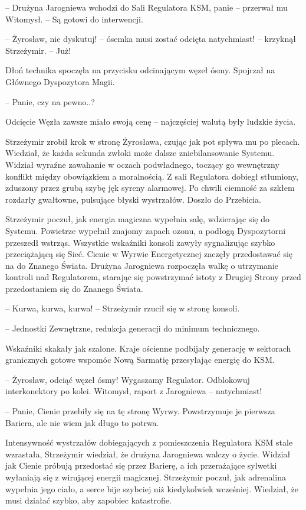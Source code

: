 \par\noindent-- Drużyna Jarogniewa wchodzi do Sali Regulatora KSM, panie -- przerwał mu Witomysł. -- Są gotowi do interwencji.
\par\noindent-- Żyrosław, nie dyskutuj! -- ósemka musi zostać odcięta natychmiast! -- krzyknął Strzeżymir. -- Już!
\par\indent Dłoń technika spoczęła na przycisku odcinającym węzeł ósmy. Spojrzał na Głównego Dyspozytora Magii.
\par\noindent-- Panie, czy na pewno..? 
\par\noindent Odcięcie Węzła zawsze miało swoją cenę -- najczęściej walutą były ludzkie życia.
\par\indent Strzeżymir zrobił krok w stronę Żyrosława, czując jak pot spływa mu po plecach. Wiedział, że każda sekunda zwłoki może dalsze zniebilansowanie Systemu. Widział wyraźne zawahanie w oczach podwładnego, toczący go wewnętrzny konflikt między obowiązkiem a moralnością. Z sali Regulatora dobiegł stłumiony, zduszony przez grubą szybę jęk syreny alarmowej. Po chwili ciemność za szkłem rozdarły gwałtowne, pulsujące błyski wystrzałów. Doszło do Przebicia.
\par\indent Strzeżymir poczuł, jak energia magiczna wypełnia salę, wdzierając się do Systemu. Powietrze wypełnił znajomy zapach ozonu, a podłogą Dyspozytorni przeszedł wstrząs. Wszystkie wskaźniki konsoli zawyły sygnalizując szybko przeciążającą się Sieć. Cienie w Wyrwie Energetycznej zaczęły przedostawać się na do Znanego Świata. Drużyna Jarogniewa rozpoczęła walkę o utrzymanie kontroli nad Regulatorem, starając się powstrzymać istoty z Drugiej Strony przed przedostaniem się do Znanego Świata.
\par\noindent-- Kurwa, kurwa, kurwa! -- Strzeżymir rzucił się w stronę konsoli.
\par\noindent-- Jednostki Zewnętrzne, redukcja generacji do minimum technicznego. 
\par\indent Wskaźniki skakały jak szalone. Kraje ościenne podbijały generację w sektorach granicznych gotowe wspomóc Nową Sarmatię przesyłając energię do KSM.
\par\indent-- Żyrosław, odciąć węzeł ósmy! Wygaszamy Regulator. Odblokowuj interkonektory po kolei. Witomysł, raport z Jarogniewa -- natychmiast!
\par\noindent-- Panie, Cienie przebiły się na tę stronę Wyrwy. Powstrzymuje je pierwsza Bariera, ale nie wiem jak długo to potrwa.
\par\indent Intensywność wystrzałów dobiegających z pomieszczenia Regulatora KSM stale wzrastała, Strzeżymir wiedział, że drużyna Jarogniewa walczy o życie. Widział jak Cienie próbują przedostać się przez Barierę, a ich przerażające sylwetki wyłaniają się z wirującej energii magicznej. Strzeżymir poczuł, jak adrenalina wypełnia jego ciało, a serce bije szybciej niż kiedykolwiek wcześniej. Wiedział, że musi działać szybko, aby zapobiec katastrofie.
